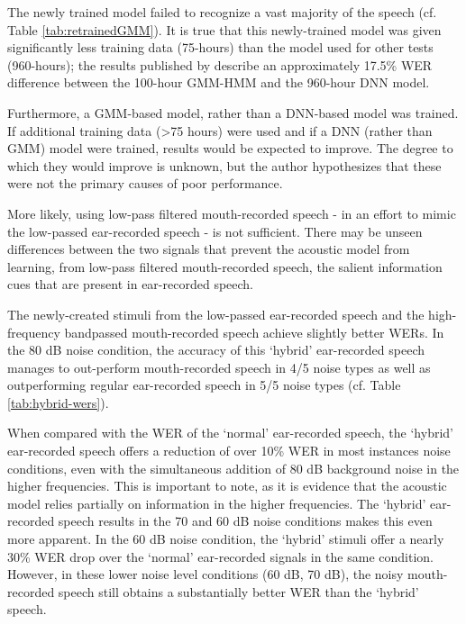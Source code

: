 
The newly trained model failed to recognize a vast majority of the speech (cf. Table \ref{tab:retrainedGMM}).  It is true that this newly-trained model was given significantly less training data (75-hours) than the model used for other tests (960-hours); the results published by \cite{panayotov:15} describe an approximately 17.5\% WER difference between the 100-hour GMM-HMM and the 960-hour DNN model.  

Furthermore, a GMM-based model, rather than a DNN-based model was trained.  If additional training data (>75 hours) were used and if a DNN (rather than GMM) model were trained, results would be expected to improve.  The degree to which they would improve is unknown, but the author hypothesizes that these were not the primary causes of poor performance.

More likely, using low-pass filtered mouth-recorded speech - in an effort to mimic the low-passed ear-recorded speech - is not sufficient.  There may be unseen differences between the two signals that prevent the acoustic model from learning, from low-pass filtered mouth-recorded speech, the salient information cues that are present in ear-recorded speech.


The newly-created stimuli from the low-passed ear-recorded speech and the high-frequency bandpassed mouth-recorded speech achieve slightly better WERs.  In the 80 dB noise condition, the accuracy of this `hybrid' ear-recorded speech manages to out-perform mouth-recorded speech in 4/5 noise types as well as outperforming regular ear-recorded speech in 5/5 noise types (cf. Table \ref{tab:hybrid-wers}).  

When compared with the WER of the `normal' ear-recorded speech, the `hybrid' ear-recorded speech offers a reduction of over 10\% WER in most instances noise conditions, even with the simultaneous addition of 80 dB background noise in the higher frequencies. This is important to note, as it is evidence that the acoustic model relies partially on information in the higher frequencies.  The `hybrid' ear-recorded speech results in the 70 and 60 dB noise conditions makes this even more apparent.  In the 60 dB noise condition, the `hybrid' stimuli offer a nearly 30\% WER drop over the `normal' ear-recorded signals in the same condition.  However, in these lower noise level conditions (60 dB, 70 dB), the noisy mouth-recorded speech still obtains a substantially better WER than the `hybrid' speech.  

